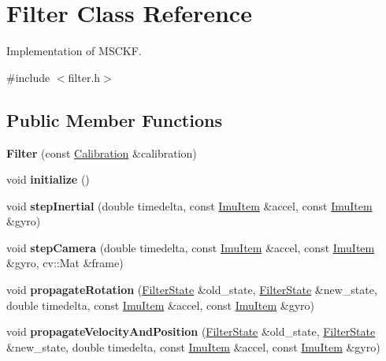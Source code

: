 \hypertarget{class_filter}{\section{Filter Class Reference}
\label{class_filter}
}


Implementation of M\-S\-C\-K\-F.  




{\ttfamily \#include $<$filter.\-h$>$}

\subsection*{Public Member Functions}
\begin{DoxyCompactItemize}
\item 
\hypertarget{class_filter_ac00d9ce620e60b2c8b26ca9cad7e1b39}{{\bfseries Filter} (const \hyperlink{class_calibration}{Calibration} \&calibration)}\label{class_filter_ac00d9ce620e60b2c8b26ca9cad7e1b39}

\item 
\hypertarget{class_filter_a5742b1247b9f92a9148d99386cdd3876}{void {\bfseries initialize} ()}\label{class_filter_a5742b1247b9f92a9148d99386cdd3876}

\item 
\hypertarget{class_filter_a27176eb65976f98cdc9495b4fdfc3296}{void {\bfseries step\-Inertial} (double timedelta, const \hyperlink{class_imu_item}{Imu\-Item} \&accel, const \hyperlink{class_imu_item}{Imu\-Item} \&gyro)}\label{class_filter_a27176eb65976f98cdc9495b4fdfc3296}

\item 
\hypertarget{class_filter_a1fad49c62892905f713de0bf66d9f3c7}{void {\bfseries step\-Camera} (double timedelta, const \hyperlink{class_imu_item}{Imu\-Item} \&accel, const \hyperlink{class_imu_item}{Imu\-Item} \&gyro, cv\-::\-Mat \&frame)}\label{class_filter_a1fad49c62892905f713de0bf66d9f3c7}

\item 
\hypertarget{class_filter_a3ed7acd6fff45ead8b4209d4e31a8097}{void {\bfseries propagate\-Rotation} (\hyperlink{class_filter_state}{Filter\-State} \&old\-\_\-state, \hyperlink{class_filter_state}{Filter\-State} \&new\-\_\-state, double timedelta, const \hyperlink{class_imu_item}{Imu\-Item} \&accel, const \hyperlink{class_imu_item}{Imu\-Item} \&gyro)}\label{class_filter_a3ed7acd6fff45ead8b4209d4e31a8097}

\item 
\hypertarget{class_filter_a778f444068abe887fd58e02f00be6121}{void {\bfseries propagate\-Velocity\-And\-Position} (\hyperlink{class_filter_state}{Filter\-State} \&old\-\_\-state, \hyperlink{class_filter_state}{Filter\-State} \&new\-\_\-state, double timedelta, const \hyperlink{class_imu_item}{Imu\-Item} \&accel, const \hyperlink{class_imu_item}{Imu\-Item} \&gyro)}\label{class_filter_a778f444068abe887fd58e02f00be6121}


\end{DoxyCompactItemize}
